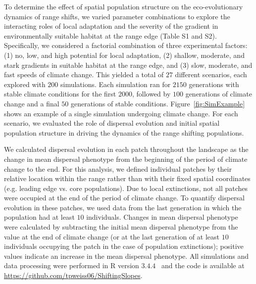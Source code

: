 \documentclass[12pt, oneside]{article}
\begin{document}
To determine the effect of spatial population structure on the eco-evolutionary dynamics of range shifts, we varied parameter combinations to explore the interacting roles of local adaptation and the severity of the gradient in environmentally suitable habitat at the range edge (Table S1 and S2). Specifically, we considered a factorial combination of three experimental factors: (1) no, low, and high potential for local adaptation, (2) shallow, moderate, and stark gradients in suitable habitat at the range edge, and (3) slow, moderate, and fast speeds of climate change. This yielded a total of $27$ different scenarios, each explored with $200$ simulations. Each simulation ran for $2150$ generations with stable climate conditions for the first $2000$, followed by $100$ generations of climate change and a final $50$ generations of stable conditions. Figure~\ref{fig:SimExample} shows an example of a single simulation undergoing climate change. For each scenario, we evaluated the role of dispersal evolution and initial spatial population structure in driving the dynamics of the range shifting populations. 

We calculated dispersal evolution in each patch throughout the landscape as the change in mean dispersal phenotype from the beginning of the period of climate change to the end. For this analysis, we defined individual patches by their relative location within the range rather than with their fixed spatial coordinates (e.g. leading edge vs. core populations). Due to local extinctions, not all patches were occupied at the end of the period of climate change. To quantify dispersal evolution in these patches, we used data from the last generation in which the population had at least $10$ individuals. Changes in mean dispersal phenotype were calculated by subtracting the initial mean dispersal phenotype from the value at the end of climate change (or at the last generation of at least $10$ individuals occupying the patch in the case of population extinctions); positive values indicate an increase in the mean dispersal phenotype. All simulations and data processing were performed in R version $3.4.4$~\citep{team2000r} and the code is available at \url{https://github.com/tpweiss06/ShiftingSlopes}.
\end{document}
